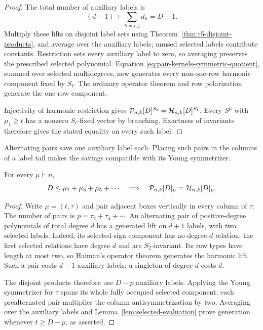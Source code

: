 \begin{proof}
The total number of auxiliary labels is
\[
                  (d-1)+\sum_{h\ne i,j}d_h=D-1.
\]
Multiply these lifts on disjoint label sets using
Theorem~\ref{thm:r5-disjoint-products}, and average over the
auxiliary labels; unused selected labels contribute constants.
Restriction sets every auxiliary label to zero, so averaging
preserves the prescribed selected polynomial.  Equation
\eqref{eq:pair-kernels-symmetric-quotient}, summed over selected
multidegrees, now generates every non-one-row harmonic component
fixed by $S_t$.  The ordinary operator theorem and row polarization
generate the one-row component.

Injectivity of harmonic restriction gives
$\mathcal P_{n,k}[D]^{S_t}=\mathcal H_{n,k}[D]^{S_t}$.
Every $S^\mu$ with $\mu_1\ge t$ has a nonzero $S_t$-fixed vector
by branching.  Exactness of invariants therefore gives the stated
equality on every such label.
\end{proof}

Alternating pairs save one auxiliary label each.  Placing such pairs in the
columns of a label tail makes the savings compatible with its
Young symmetrizer.

\begin{theorem}
\label{thm:odd-row-generation}
For every $\mu\vdash n$,
\[
 D\le\mu_1+\mu_3+\mu_5+\cdots
 \quad\Longrightarrow\quad
 \mathcal P_{n,k}[D]_\mu=\mathcal H_{n,k}[D]_\mu .
\]
\end{theorem}
\begin{proof}
Write $\mu=(t,\tau)$ and pair adjacent boxes vertically in every
column of $\tau$. The number of pairs is
$p=\tau_2+\tau_4+\cdots$.
An alternating pair of positive-degree polynomials of total degree $d$
has a generated lift on $d+1$ labels, with two selected labels.
Indeed, its selected-sign component has no degree-$d$ relation:
the first selected relations have degree $d$ and are $S_2$-invariant.
Its row types have length at most two, so Haiman's operator theorem
generates the harmonic lift. Such a pair costs $d-1$ auxiliary labels;
a singleton of degree $d$ costs $d$.

The disjoint products therefore use $D-p$ auxiliary labels. Applying the
Young symmetrizer for $\tau$ spans its whole fully occupied selected
component: each prealternated pair multiplies the column
antisymmetrization by two. Averaging over the auxiliary labels and Lemma~\ref{lem:selected-evaluation} prove generation whenever $t\ge D-p$, as asserted.
\end{proof}

